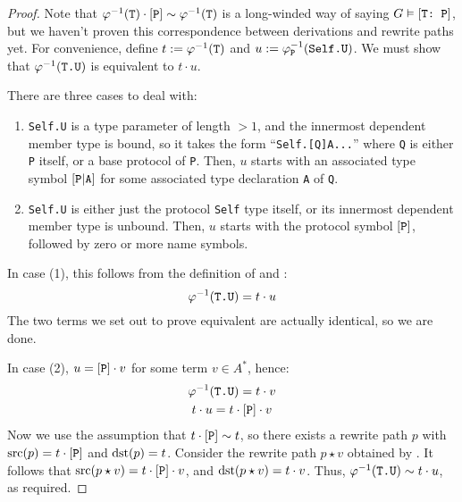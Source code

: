 \documentclass[../generics]{subfiles}
\begin{document}
\begin{proof}
Note that $\varphi^{-1}(\texttt{T})\cdot[\texttt{P}]\sim\varphi^{-1}(\texttt{T})$ is a long-winded way of saying $G\vDash[\texttt{T:~P}]$, but we haven't proven this correspondence between derivations and rewrite paths yet. For convenience, define $t:=\varphi^{-1}(\texttt{T})$ and $u:=\varphi^{-1}_\texttt{P}(\texttt{Self.U})$. We must show that $\varphi^{-1}(\texttt{T.U})$ is equivalent to $t\cdot u$.

There are three cases to deal with:
\begin{enumerate}
\item \texttt{Self.U} is a type parameter of length $>1$, and the innermost dependent member type is bound, so it takes the form ``\texttt{Self.[Q]A...}'' where \texttt{Q} is either \texttt{P} itself, or a base protocol of \texttt{P}. Then, $u$ starts with an associated type symbol $[\texttt{P}|\texttt{A}]$ for some associated type declaration \texttt{A} of \texttt{Q}.
\item \texttt{Self.U} is either just the protocol \texttt{Self} type itself, or its innermost dependent member type is unbound. Then, $u$ starts with the protocol symbol $[\texttt{P}]$, followed by zero or more name symbols.
\end{enumerate}

In case (1), this follows from the definition of  and :
\[\varphi^{-1}(\texttt{T.U})=t\cdot u\]
The two terms we set out to prove equivalent are actually identical, so we are done.

In case (2), $u=[\texttt{P}]\cdot v$ for some term $v\in A^*$, hence:
\begin{gather*}
\varphi^{-1}(\texttt{T.U})=t\cdot v\\
t\cdot u=t\cdot [\texttt{P}]\cdot v
\end{gather*}
Now we use the assumption that $t\cdot[\texttt{P}]\sim t$, so there exists a rewrite path $p$ with $\operatorname{src}(p)=t\cdot[\texttt{P}]$ and $\operatorname{dst}(p)=t$. Consider the rewrite path $p\star v$ obtained by . It follows that $\operatorname{src}(p\star v)=t\cdot[\texttt{P}]\cdot v$, and $\operatorname{dst}(p\star v)=t\cdot v$. Thus,
$\varphi^{-1}(\texttt{T.U})\sim t\cdot u$, as required.
\end{proof}
\end{document}
